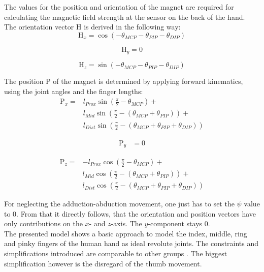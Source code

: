 The values for the position and orientation of the magnet are required for calculating the magnetic field strength at the sensor on the back of the hand.\\
The orientation vector $ \mathrm{H} $ is derived in the following way:\\
\begin{equation}\label{eq:orienX}
\mathrm{H}_{x} = \cos(-\theta_{MCP}-\theta_{PIP}-\theta_{DIP})
\end{equation}

\begin{equation}\label{eq:orienY}
\mathrm{H}_{y} = 0
\end{equation}

\begin{equation}\label{eq:orienZ}
\mathrm{H}_{z} = \sin(-\theta_{MCP}-\theta_{PIP}-\theta_{DIP})
\end{equation}

The position $ \mathrm{P} $ of the magnet is determined by applying forward kinematics, using the joint angles and the finger lengths:
\begin{equation}\label{eq:posX}
\begin{aligned}
\mathrm{P}_{x} =& l_{Prox}\sin(\frac{\pi}{2}-\theta_{MCP}) +\\
& l_{Mid}\sin(\frac{\pi}{2}-(\theta_{MCP}+\theta_{PIP})) +\\
& l_{Dist}\sin(\frac{\pi}{2}-(\theta_{MCP}+\theta_{PIP}+\theta_{DIP})) 
\end{aligned}
\end{equation}

\begin{equation}\label{eq:angleY}
\begin{aligned}
\mathrm{P}_{y} &= 0
\end{aligned}
\end{equation}

\begin{equation}\label{eq:angleZ}
\begin{aligned}
\mathrm{P}_{z} =& -l_{Prox}\cos(\frac{\pi}{2}-\theta_{MCP}) +\\
& l_{Mid}\cos(\frac{\pi}{2}-(\theta_{MCP}+\theta_{PIP})) +\\
& l_{Dist}\cos(\frac{\pi}{2}-(\theta_{MCP}+\theta_{PIP}+\theta_{DIP})) 
\end{aligned}
\end{equation}

For neglecting the adduction-abduction movement, one just has to set the $ \psi $ value to 0. From that it directly follows, that the orientation and position vectors have only contributions on the $ x $- and $ z $-axis. The $ y $-component stays 0.\\
The presented model shows a basic approach to model the index, middle, ring and pinky fingers of the human hand as ideal revolute joints. The constraints and simplifications introduced are comparable to other groups \cite{lin2000modeling}. The biggest simplification however is the disregard of the thumb movement.



